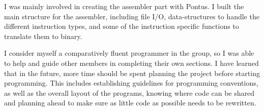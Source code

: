 I was mainly involved in creating the assembler part with Pontus. I built the main structure for the assembler, including file I/O, data-structures to handle the different instruction types, and some of the instruction specific functions to translate them to binary. 

I consider myself a comparatively fluent programmer in the group, so I was able to help and guide other members in completing their own sections. I have learned that in the future, more time should be spent planning the project before starting programming. This includes establishing guidelines for programming conventions, as well as the overall layout of the programs, knowing where code can be shared and planning ahead to make sure as little code as possible needs to be rewritten.
